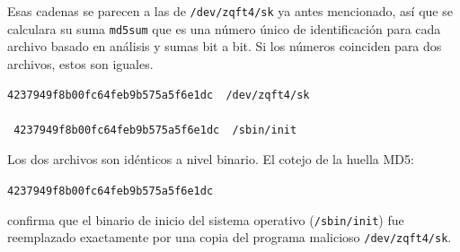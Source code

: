 \vspace{1em}

 Esas cadenas se parecen a las de \texttt{/dev/zqft4/sk} ya antes mencionado,
así que se calculara su suma \texttt{md5sum} que es una número único de
identificación para cada archivo basado en análisis y sumas bit a
bit. Si los números coinciden para dos archivos, estos son iguales.

 \vspace{1em}

\begin{lstlisting}[style=terminal]
 4237949f8b00fc64feb9b575a5f6e1dc  /dev/zqft4/sk

 4237949f8b00fc64feb9b575a5f6e1dc  /sbin/init
\end{lstlisting}

\vspace{1em}



 Los dos archivos son idénticos a nivel binario. El cotejo de la huella MD5:
\begin{center}
\texttt{4237949f8b00fc64feb9b575a5f6e1dc}
\end{center}
confirma que el binario de inicio del sistema operativo (\texttt{/sbin/init}) fue reemplazado exactamente por una copia del programa malicioso \texttt{/dev/zqft4/sk}.

